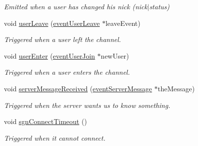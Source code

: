 \begin{DoxyCompactItemize}
\begin{DoxyCompactList}\small\item\em Emitted when a user has changed his nick (nick$|$status) \end{DoxyCompactList}\item 
void \hyperlink{classclient_1_1cls_server_conn_a89ac2b4edd0a40b0fbfb5504904752c9}{user\-Leave} (\hyperlink{classshared_1_1events_1_1event_user_leave}{event\-User\-Leave} $\ast$leave\-Event)
\begin{DoxyCompactList}\small\item\em Triggered when a user left the channel. \end{DoxyCompactList}\item 
void \hyperlink{classclient_1_1cls_server_conn_a9f3b4fe1b687bdb31ab584493b8dde91}{user\-Enter} (\hyperlink{classshared_1_1events_1_1event_user_join}{event\-User\-Join} $\ast$new\-User)
\begin{DoxyCompactList}\small\item\em Triggered when a user enters the channel. \end{DoxyCompactList}\item 
void \hyperlink{classclient_1_1cls_server_conn_a7756cad0bea903cd816c1fb68cac65fe}{server\-Message\-Received} (\hyperlink{classshared_1_1events_1_1event_server_message}{event\-Server\-Message} $\ast$the\-Message)
\begin{DoxyCompactList}\small\item\em Triggered when the server wants us to know something. \end{DoxyCompactList}\item 
void \hyperlink{classclient_1_1cls_server_conn_af0d708fd1a5059ca1b2c8c0829bbb690}{sgn\-Connect\-Timeout} ()
\begin{DoxyCompactList}\small\item\em Triggered when it cannot connect. \end{DoxyCompactList}\end{DoxyCompactItemize}
